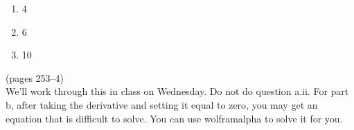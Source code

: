 \documentclass[12pt]{article}
\begin{document}
\begin{enumerate}
\setlength{\itemsep}{-1mm}
\item 4
\item 6
\item 10
\end{enumerate}

 (pages 253--4)\\

\noindent We'll work through this in class on Wednesday.  Do not do question
a.ii.   For part b, after taking the derivative and setting it equal
to zero, you may get an equation that is difficult to solve.  You can
use wolframalpha to solve it for you.
\end{document}
